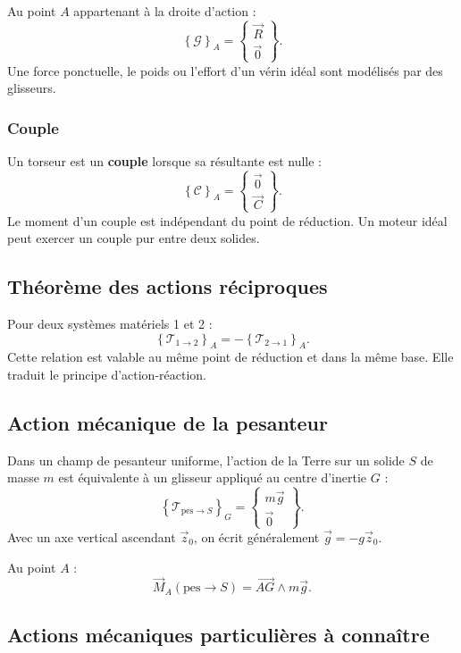 Au point $A$ appartenant à la droite d'action :
\[
\left\{\mathcal G\right\}_A=
\left\{
\begin{array}{c}
\vec R\\
\vec 0
\end{array}
\right\}.
\]
Une force ponctuelle, le poids ou l'effort d'un vérin idéal sont modélisés par des glisseurs.

\subsubsection{Couple}

Un torseur est un \textbf{couple} lorsque sa résultante est nulle :
\[
\left\{\mathcal C\right\}_A=
\left\{
\begin{array}{c}
\vec 0\\
\vec C
\end{array}
\right\}.
\]
Le moment d'un couple est indépendant du point de réduction. Un moteur idéal peut exercer un couple pur entre deux solides.

\subsection{Théorème des actions réciproques}

Pour deux systèmes matériels 1 et 2 :
\[
\left\{\mathcal T_{1\rightarrow2}\right\}_A
=-\left\{\mathcal T_{2\rightarrow1}\right\}_A.
\]
Cette relation est valable au même point de réduction et dans la même base. Elle traduit le principe d'action-réaction.

\subsection{Action mécanique de la pesanteur}

Dans un champ de pesanteur uniforme, l'action de la Terre sur un solide $S$ de masse $m$ est équivalente à un glisseur appliqué au centre d'inertie $G$ :
\[
\left\{\mathcal T_{\mathrm{pes}\rightarrow S}\right\}_G=
\left\{
\begin{array}{c}
m\vec g\\
\vec 0
\end{array}
\right\}.
\]
Avec un axe vertical ascendant $\vec z_0$, on écrit généralement $\vec g=-g\vec z_0$.

Au point $A$ :
\[
\vec M_A(\mathrm{pes}\rightarrow S)=\overrightarrow{AG}\wedge m\vec g.
\]

\subsection{Actions mécaniques particulières à connaître}

